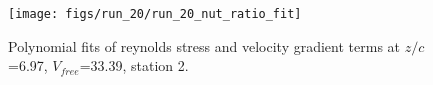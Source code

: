 \begin{figure}[H]
\centering
\texttt{[image: figs/run\_20/run\_20\_nut\_ratio\_fit]}
\caption{Polynomial fits of reynolds stress and velocity gradient terms at $z/c$=6.97, $V_{free}$=33.39, station 2.}
\label{fig:run_20_nut_ratio_fit}
\end{figure}


